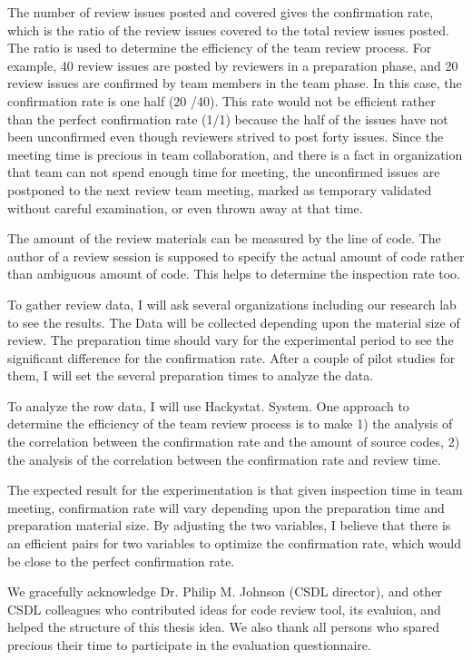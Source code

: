 \documentclass[11pt,twocolumn]{article}
\begin{document}
The number of review issues posted and covered gives the
confirmation rate, which is the ratio of the review issues covered
to the total review issues posted. The ratio is used to determine
the efficiency of the team review process. For example, 40 review
issues are posted by reviewers in a preparation phase, and 20 review
issues are confirmed by team members in the team phase. In this
case, the confirmation rate is one half (20 /40). This rate would
not be efficient rather than the perfect confirmation rate (1/1)
because the half of the issues have not been unconfirmed even though
reviewers strived to post forty issues. Since the meeting time is
precious in team collaboration, and there is a fact in organization
that team can not spend enough time for meeting, the unconfirmed
issues are postponed to the next review team meeting, marked as
temporary validated without careful examination, or even thrown away
at that time.

The amount of the review materials can be measured by the line of
code. The author of a review session is supposed to specify the
actual amount of code rather than ambiguous amount of code. This
helps to determine the inspection rate too.

To gather review data, I will ask several organizations including
our research lab to see the results. The Data will be collected
depending upon the material size of review. The preparation time
should vary for the experimental period to see the significant
difference for the confirmation rate. After a couple of pilot
studies for them, I will set the several preparation times to
analyze the data.

To analyze the row data, I will use Hackystat. System. One approach
to determine the efficiency of the team review process is to make 1)
the analysis of the correlation between the confirmation rate and
the amount of source codes, 2) the analysis of the correlation
between the confirmation rate and review time.

 \label{sec:results}

The expected result for the experimentation is that given inspection
time in team meeting, confirmation rate will vary depending upon the
preparation time and preparation material size. By adjusting the two
variables, I believe that there is an efficient pairs for two
variables to optimize the confirmation rate, which would be close to
the perfect confirmation rate.

 \label{sec:acknowledgment}

We gracefully acknowledge Dr. Philip M. Johnson (CSDL director), and
other CSDL colleagues who contributed ideas for code review tool,
its evaluion, and helped the structure of this thesis idea. We
also thank all persons who spared precious their time to participate
in the evaluation questionnaire.



\end{document}
